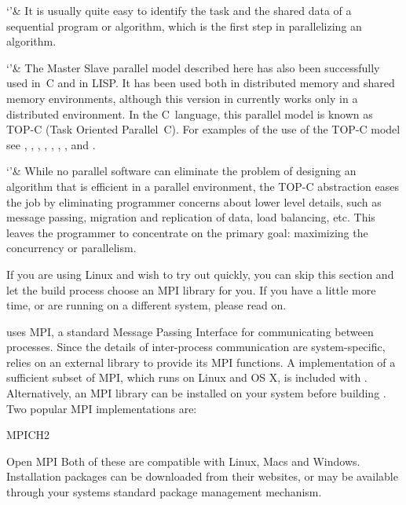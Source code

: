 `'& It is usually quite easy to identify the task and the shared data  of
    a sequential program  or  algorithm,  which  is  the  first  step  in
    parallelizing an algorithm.

`'& The  Master  Slave  parallel  model  described  here  has  also  been
    successfully used in~C  and  in  LISP.  It  has  been  used  both  in
    distributed memory and  shared  memory  environments,  although  this
    version in {\GAP} currently works only in a distributed  environment.
    In the C~language, this  parallel  model  is  known  as  TOP-C  (Task
    Oriented Parallel~C). For examples of the use of the TOP-C model  see
    \cite{Coo98},     \cite{CCHW02},      \cite{CFTY94},     \cite{CG02},
    \cite{CH97}, \cite{CHLM97}, \cite{CLMW96}, and \cite{CT96}.

`'& While no parallel software can eliminate the problem of designing  an
    algorithm that is efficient in  a  parallel  environment,  the  TOP-C
    abstraction eases the job by eliminating  programmer  concerns  about
    lower  level  details,  such  as  message  passing,   migration   and
    replication of data, load balancing, etc. This leaves the  programmer
    to concentrate on the primary goal:  maximizing  the  concurrency  or
    parallelism.

\enditems


If you are using Linux and wish to try out {\ParGAP} quickly, you
can skip this section and let the {\ParGAP} build process choose an MPI
library for you. If you have a little more time, or are running on a different
system, please read on.

{\ParGAP} uses MPI, a standard Message Passing  Interface for 
communicating between processes. Since the details of inter-process 
communication are system-specific, {\ParGAP} relies on an external library
to provide its MPI functions. A implementation of a sufficient subset of MPI,
which runs on Linux and OS X, is included with {\ParGAP}. Alternatively, an MPI
library can be installed on your system before building {\ParGAP}. Two popular
MPI implementations are:
\beginlist
\item{} MPICH2 
\item{} Open MPI 
\endlist
Both of these are compatible with Linux, Macs and Windows. Installation packages
can be downloaded from their websites, or may be available through your systems
standard package management mechanism.

